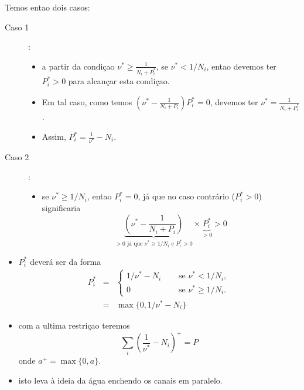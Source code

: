 \begin{frame}[allowframebreaks]
  Temos entao dois casos:
  \begin{description}
  \item[Caso 1]: 
 	\begin{itemize}
	\item a partir da condiçao $\nu^\ast \geq \frac{1}{N_i + P_i^\ast}$, se $\nu^\ast < 1 / N_i$, entao
	devemos ter $P_i^\ast > 0$ para alcançar esta condiçao.
	\item Em tal caso, como temos $\left( \nu^\ast - \frac{1}{N_i + P_i} \right) P_i^\ast = 0$, devemos ter
	$\nu^\ast = \frac{1}{N_i + P_i^\ast}$.
	\item Assim, $P_i^\ast = \frac{1}{\nu^\ast} - N_i$.
	\end{itemize}
  \item[Caso 2]:
	\begin{itemize}
        \item se $\nu^\ast \geq 1/N_i$, entao $P_i^\ast = 0$, já que no caso contrário ($P_i^\ast > 0$) 
	significaria
		\begin{equation}
		\underbrace{ \left( \nu^\ast - \frac{1}{N_i + P_i} \right) }_{> 0 \text{ já que } \nu^\ast \geq 1/N_i \text{ e } P_i^\ast > 0} \times \underbrace{ P_i^\ast }_{> 0} > 0
		\end{equation}
	\end{itemize}
  \end{description}
 

  \framebreak

  \begin{itemize}
  \item $P_i^\ast$ deverá ser da forma
	\begin{eqnarray}
	P_i^\ast &=& \begin{cases}
			1/\nu^\ast - N_i & \quad \text{ se } \nu^\ast < 1 / N_i , \\
			0 		& \quad \text{ se } \nu^\ast \geq 1 / N_i .
			\end{cases}  \\
		&=& \max \{ 0, 1/\nu^\ast - N_i \}
	\end{eqnarray}
  \item com a ultima restriçao teremos
	\begin{equation}
	\sum_i \left( \frac{1}{\nu^\ast} - N_i \right)^{+} = P
	\end{equation}
	onde $a^{+} = \max \{ 0, a\}$.

  \item isto leva à ideia da água enchendo os canais em paralelo.
  \end{itemize} 


\end{frame}
